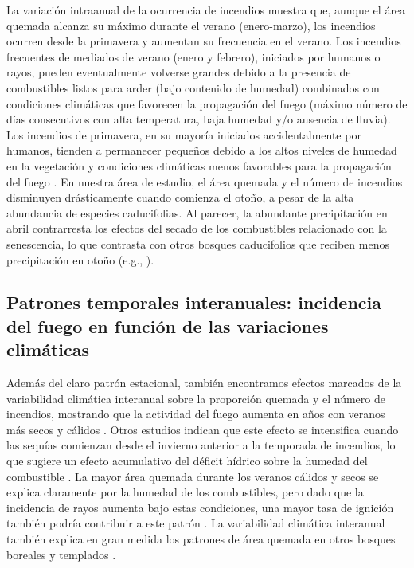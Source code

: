 La variación intraanual de la ocurrencia de incendios muestra que, aunque el área quemada alcanza su máximo durante el verano (enero-marzo), los incendios ocurren desde la primavera y aumentan su frecuencia en el verano. Los incendios frecuentes de mediados de verano (enero y febrero), iniciados por humanos o rayos, pueden eventualmente volverse grandes debido a la presencia de combustibles listos para arder (bajo contenido de humedad) combinados con condiciones climáticas que favorecen la propagación del fuego (máximo número de días consecutivos con alta temperatura, baja humedad y/o ausencia de lluvia). Los incendios de primavera, en su mayoría iniciados accidentalmente por humanos, tienden a permanecer pequeños debido a los altos niveles de humedad en la vegetación y condiciones climáticas menos favorables para la propagación del fuego \citep{barbera_microclimate_2023}. En nuestra área de estudio, el área quemada y el número de incendios disminuyen drásticamente cuando comienza el otoño, a pesar de la alta abundancia de especies caducifolias. Al parecer, la abundante precipitación en abril contrarresta los efectos del secado de los combustibles relacionado con la senescencia, lo que contrasta con otros bosques caducifolios que reciben menos precipitación en otoño (e.g., \citealt{tian_wildfires_2011}).

\subsection{Patrones temporales interanuales: incidencia del fuego en función de las variaciones climáticas}

Además del claro patrón estacional, también encontramos efectos marcados de la variabilidad climática interanual sobre la proporción quemada y el número de incendios, mostrando que la actividad del fuego aumenta en años con veranos más secos y cálidos \citep{kitzberger_climatic_1997, kitzberger_influences_1997, holz_ecological_2012, de_torres_curth_incendios_2008, kitzberger_projections_2022}. Otros estudios indican que este efecto se intensifica cuando las sequías comienzan desde el invierno anterior a la temporada de incendios, lo que sugiere un efecto acumulativo del déficit hídrico sobre la humedad del combustible \citep{kitzberger_climatic_1997, kitzberger_influences_1997, de_torres_curth_incendios_2008, kitzberger_projections_2022}. La mayor área quemada durante los veranos cálidos y secos se explica claramente por la humedad de los combustibles, pero dado que la incidencia de rayos aumenta bajo estas condiciones, una mayor tasa de ignición también podría contribuir a este patrón \citep{kitzberger_climatic_1997}. La variabilidad climática interanual también explica en gran medida los patrones de área quemada en otros bosques boreales y templados \citep{gill_top-down_2009, whitlock_past_2015, sommerfeld_patterns_2018, seidl_globally_2020, gaboriau_drivers_2022}.

